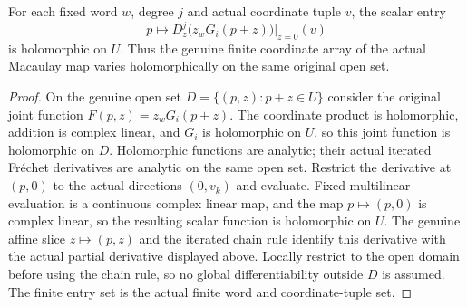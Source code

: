 \begin{lemma}
\label{hir:actual-macaulay-jet-columns-holomorphic}
\leanok
{}
For each fixed word $w$, degree $j$ and actual coordinate tuple $v$, the
scalar entry
\[
p\longmapsto D_z^j\bigl(z_wG_i(p+z)\bigr)\big|_{z=0}(v)
\]
is holomorphic on $U$. Thus the genuine finite coordinate array of the
actual Macaulay map varies holomorphically on the same original open set.
\end{lemma}
\begin{proof}
On the genuine open set $D=\{(p,z):p+z\in U\}$ consider the original joint
function $F(p,z)=z_wG_i(p+z)$. The coordinate product is holomorphic, addition
is complex linear, and $G_i$ is holomorphic on $U$, so this joint function
is holomorphic on $D$. Holomorphic functions are analytic; their actual
iterated Fr\'echet derivatives are analytic on the same open set. Restrict
the derivative at $(p,0)$ to the actual directions $(0,v_k)$ and evaluate.
Fixed multilinear evaluation is a continuous complex linear map, and the
map $p\mapsto(p,0)$ is complex linear, so the resulting scalar function is
holomorphic on $U$. The genuine affine slice $z\mapsto(p,z)$ and the
iterated chain rule identify this derivative with the actual partial
derivative displayed above. Locally restrict to the open domain before
using the chain rule, so no global differentiability outside $D$ is assumed.
The finite entry set is the actual finite word and coordinate-tuple set.
\end{proof}

